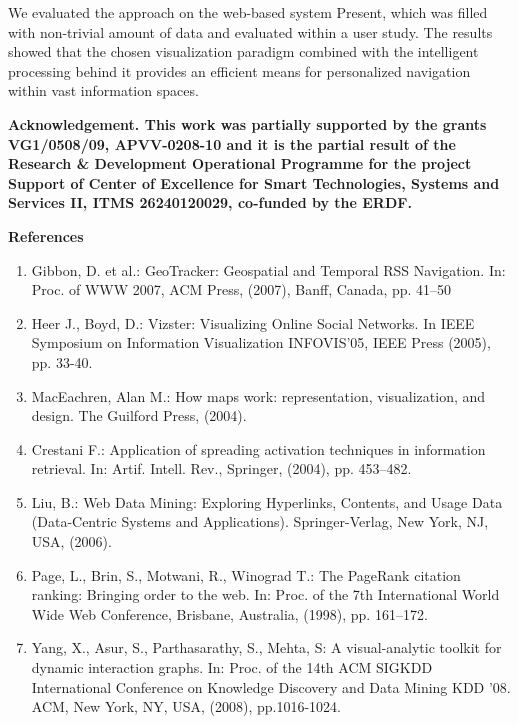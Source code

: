 \documentclass[10pt]{article}
\begin{document}
We evaluated the approach on the web-based system Present, which was filled with non-trivial amount of data and evaluated within a user study. The results showed that the chosen visualization paradigm combined with the intelligent processing behind it provides an efficient means for personalized navigation within vast information spaces.

\begin{description}
\item \bf Acknowledgement. \rm This work was partially supported by the grants VG1/0508/09, APVV-0208-10 and it is the partial result of the Research \& Development Operational Programme for the project Support of Center of Excellence for Smart Technologies, Systems and Services II, ITMS 26240120029, co-funded by the ERDF.
\end{description}

\bf References \rm

\begin{enumerate}
\item Gibbon, D. et al.: GeoTracker: Geospatial and Temporal RSS Navigation. In: Proc. of WWW 2007, ACM Press, (2007), Banff, Canada, pp. 41–50
\item Heer J., Boyd, D.: Vizster: Visualizing Online Social Networks. In IEEE Symposium on Information Visualization INFOVIS'05, IEEE Press (2005), pp. 33-40.
\item MacEachren, Alan M.: How maps work: representation, visualization, and design. The Guilford Press, (2004).~\item Crestani F.: Application of spreading activation techniques in information retrieval. In: Artif. Intell. Rev., Springer, (2004), pp. 453–482.
\item Liu, B.: Web Data Mining: Exploring Hyperlinks, Contents, and Usage Data (Data-Centric Systems and Applications). Springer-Verlag, New York, NJ, USA, (2006).
\item Page, L., Brin, S., Motwani, R., Winograd T.: The PageRank citation ranking: Bringing order to the web. In: Proc. of the 7th International World Wide Web Conference, Brisbane, Australia, (1998), pp. 161–172.
\item Yang, X., Asur, S., Parthasarathy, S., Mehta, S: A visual-analytic toolkit for dynamic interaction graphs. In: Proc. of the 14th ACM SIGKDD International Conference on Knowledge Discovery and Data Mining KDD '08. ACM, New York, NY, USA, (2008), pp.1016-1024.
\end{enumerate}
\end{document}
